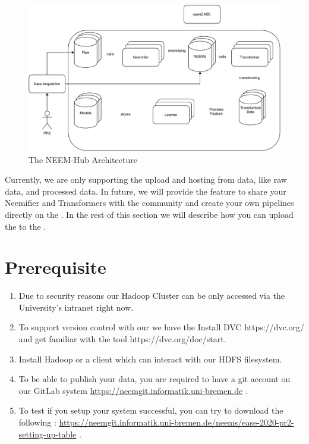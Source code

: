 \begin{figure}[h!]
	\centering
	\includegraphics[width=\linewidth]{img/NEEM-Hub.pdf}
	\caption{The NEEM-Hub Architecture}
	\label{fig:neem-hub}
\end{figure} 


Currently, we are only supporting the upload and hosting from data, like raw data, \neems and processed data.
In future, we will provide the feature to share your Neemifier and Transformers with the community and create your own pipelines directly on the \neemhub.
In the rest of this section we will describe how you can upload the \neems to the \neemhub.

\section{Prerequisite}
\begin{enumerate}
	\item Due to security reasons our Hadoop Cluster can be only accessed via the University's intranet right now.	
	\item To support version control with our \neems we have the Install DVC https://dvc.org/ and get familiar with the tool https://dvc.org/doc/start.
	\item Install Hadoop or a client which can interact with our HDFS filesystem. 
	\item To be able to publish your data, you are required to have a git account on our GitLab system
	\url{https://neemgit.informatik.uni-bremen.de} .
	\item To test if you setup your system successful, you can try to download the following \neems : \url{https://neemgit.informatik.uni-bremen.de/neems/ease-2020-pr2-setting-up-table} .
\end{enumerate}


